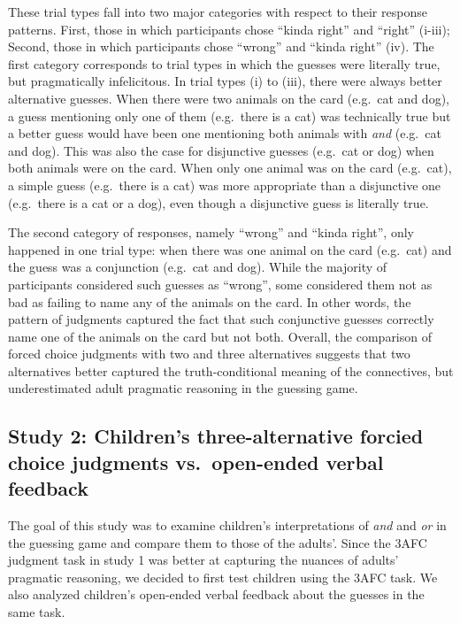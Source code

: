 \documentclass[floatsintext,man]{apa6}
\theoremstyle{definition}
\theoremstyle{definition}
\theoremstyle{definition}
\theoremstyle{remark}
\begin{document}
These trial types fall into two major categories with respect to their
response patterns. First, those in which participants chose
\enquote{kinda right} and \enquote{right} (i-iii); Second, those in
which participants chose \enquote{wrong} and \enquote{kinda right} (iv).
The first category corresponds to trial types in which the guesses were
literally true, but pragmatically infelicitous. In trial types (i) to
(iii), there were always better alternative guesses. When there were two
animals on the card (e.g.~cat and dog), a guess mentioning only one of
them (e.g.~there is a cat) was technically true but a better guess would
have been one mentioning both animals with \emph{and} (e.g.~cat and
dog). This was also the case for disjunctive guesses (e.g.~cat or dog)
when both animals were on the card. When only one animal was on the card
(e.g.~cat), a simple guess (e.g.~there is a cat) was more appropriate
than a disjunctive one (e.g.~there is a cat or a dog), even though a
disjunctive guess is literally true.

The second category of responses, namely \enquote{wrong} and
\enquote{kinda right}, only happened in one trial type: when there was
one animal on the card (e.g.~cat) and the guess was a conjunction
(e.g.~cat and dog). While the majority of participants considered such
guesses as \enquote{wrong}, some considered them not as bad as failing
to name any of the animals on the card. In other words, the pattern of
judgments captured the fact that such conjunctive guesses correctly name
one of the animals on the card but not both. Overall, the comparison of
forced choice judgments with two and three alternatives suggests that
two alternatives better captured the truth-conditional meaning of the
connectives, but underestimated adult pragmatic reasoning in the
guessing game.

\subsection{Study 2: Children's three-alternative forcied choice
judgments vs.~open-ended verbal feedback}\label{study2}

The goal of this study was to examine children's interpretations of
\emph{and} and \emph{or} in the guessing game and compare them to those
of the adults'. Since the 3AFC judgment task in study 1 was better at
capturing the nuances of adults' pragmatic reasoning, we decided to
first test children using the 3AFC task. We also analyzed children's
open-ended verbal feedback about the guesses in the same task.
\end{document}
